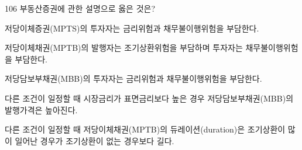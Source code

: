 \begin{question}{106}
부동산증권에 관한 설명으로 옳은 것은?
\begin{choices}
  \item 저당이체증권(MPTS)의 투자자는 금리위험과 채무불이행위험을 부담한다.
  \item 저당이체채권(MPTB)의 발행자는 조기상환위험을 부담하며 투자자는 채무불이행위험을 부담한다.
  \item 저당담보부채권(MBB)의 투자자는 금리위험과 채무불이행위험을 부담한다.
  \item 다른 조건이 일정할 때 시장금리가 표면금리보다 높은 경우 저당담보부채권(MBB)의 발행가격은 높아진다.
  \item 다른 조건이 일정할 때 저당이체채권(MPTB)의 듀레이션(duration)은 조기상환이 많이 일어난 경우가 조기상환이 없는 경우보다 길다.
\end{choices}
\end{question}

